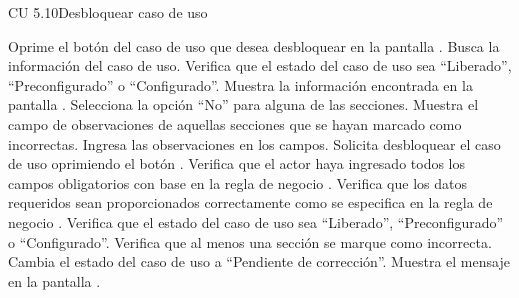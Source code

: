 \begin{UseCase}{CU 5.10}{Desbloquear caso de uso}

\end{UseCase}
 \begin{UCtrayectoria}
	\UCpaso[\UCactor] Oprime el botón \btnDesbloquear del caso de uso que desea desbloquear en la pantalla .
    \UCpaso[\UCsist] Busca la información del caso de uso. 
    \UCpaso[\UCsist] Verifica que el estado del caso de uso sea ``Liberado'', ``Preconfigurado'' o ``Configurado''. 
    \UCpaso[\UCsist] Muestra la información encontrada en la pantalla .
    \UCpaso[\UCactor] Selecciona la opción ``No'' para alguna de las secciones.  \label{cu5.10:selecciona}
    \UCpaso[\UCsist] Muestra el campo de observaciones de aquellas secciones que se hayan marcado como incorrectas.
    \UCpaso[\UCactor] Ingresa las observaciones en los campos.
	\UCpaso[\UCactor] Solicita desbloquear el caso de uso oprimiendo el botón .  \label{cu5.10:oprime}
	\UCpaso[\UCsist] Verifica que el actor haya ingresado todos los campos obligatorios con base en la regla de negocio . 
	\UCpaso[\UCsist] Verifica que los datos requeridos sean proporcionados correctamente como se especifica en la regla de negocio . 
    \UCpaso[\UCsist] Verifica que el estado del caso de uso sea ``Liberado'', ``Preconfigurado'' o ``Configurado''. 
    \UCpaso[\UCsist] Verifica que al menos una sección se marque como incorrecta. 
    \UCpaso[\UCsist] Cambia el estado del caso de uso a ``Pendiente de corrección''.
    \UCpaso[\UCsist] Muestra el mensaje  en la pantalla .
 \end{UCtrayectoria}
 
